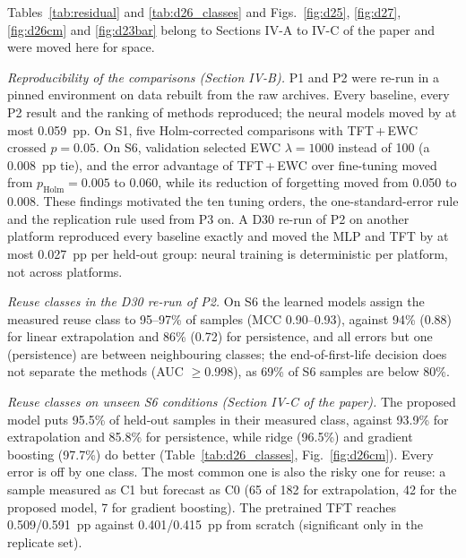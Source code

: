 \documentclass[conference]{IEEEtran}
\begin{document}
Tables~\ref{tab:residual} and \ref{tab:d26_classes} and Figs.~\ref{fig:d25}, \ref{fig:d27}, \ref{fig:d26cm} and \ref{fig:d23bar} belong to Sections IV-A to IV-C of the paper and
were moved here for space.

\emph{Reproducibility of the comparisons (Section IV-B).} P1 and P2 were re-run in a pinned environment on data rebuilt from the raw archives. Every baseline, every P2 result and the ranking of methods reproduced; the neural models moved by at most 0.059~pp. On S1, five Holm-corrected comparisons with TFT\,+\,EWC crossed $p=0.05$. On S6, validation selected EWC $\lambda=1000$ instead of 100 (a 0.008~pp tie), and the error advantage of TFT\,+\,EWC over fine-tuning moved from $p_{\mathrm{Holm}}=0.005$ to 0.060, while its reduction of forgetting moved from 0.050 to 0.008. These findings motivated the ten tuning orders, the one-standard-error rule and the replication rule used from P3 on. A D30 re-run of P2 on another platform reproduced every baseline exactly and moved the MLP and TFT by at most 0.027~pp per held-out group: neural training is deterministic per platform, not across platforms.

\emph{Reuse classes in the D30 re-run of P2.} On S6 the learned models assign the measured reuse class to 95--97\% of samples (MCC 0.90--0.93), against 94\% (0.88) for linear extrapolation and 86\% (0.72) for persistence, and all errors but one (persistence) are between neighbouring classes; the end-of-first-life decision does not separate the methods (AUC $\ge$0.998), as 69\% of S6 samples are below 80\%.

\emph{Reuse classes on unseen S6 conditions (Section IV-C of the paper).} The proposed model puts 95.5\% of held-out samples in their measured class, against 93.9\% for extrapolation and 85.8\% for persistence, while ridge (96.5\%) and gradient boosting (97.7\%) do better (Table~\ref{tab:d26_classes}, Fig.~\ref{fig:d26cm}). Every error is off by one class. The most common one is also the risky one for reuse: a sample measured as C1 but forecast as C0 (65 of 182 for extrapolation, 42 for the proposed model, 7 for gradient boosting). The pretrained TFT reaches 0.509/0.591~pp against 0.401/0.415~pp from scratch (significant only in the replicate set).
\end{document}
